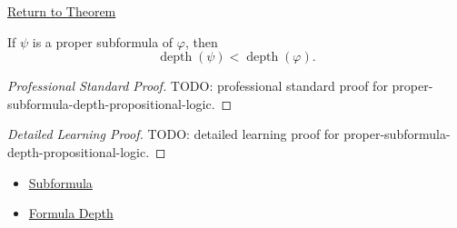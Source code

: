 \newpage
{}
\label{prf:proper-subformula-depth-propositional-logic}

\begin{remark*}[Return]
\hyperref[lem:proper-subformula-depth-propositional-logic]{Return to Theorem}
\end{remark*}

\begin{theorem*}
If \(\psi\) is a proper subformula of \(\varphi\), then
\[
\operatorname{depth}(\psi)<\operatorname{depth}(\varphi).
\]
\end{theorem*}

\begin{proof}[Professional Standard Proof]
\LRAProofBodyStart
TODO: professional standard proof for proper-subformula-depth-propositional-logic.
\end{proof}

\begin{proof}[Detailed Learning Proof]
\LRAProofBodyStart
TODO: detailed learning proof for proper-subformula-depth-propositional-logic.
\end{proof}

\begin{remark*}
\end{remark*}

\begin{dependencies}
\begin{itemize}
  \item \hyperref[def:subformula-propositional-logic]{Subformula}
  \item \hyperref[def:formula-depth-propositional-logic]{Formula Depth}
\end{itemize}
\end{dependencies}

\clearpage

